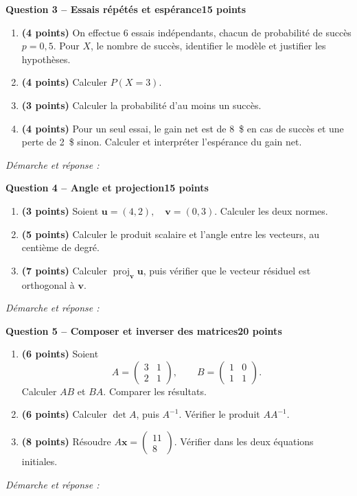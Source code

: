 \documentclass[11pt,a4paper]{article}
\begin{document}
\newpage
{\large\bfseries Question 3 -- Essais répétés et espérance}\hfill\textbf{15 points}\par
\begin{enumerate}
\item \textbf{(4 points)} On effectue 6 essais indépendants, chacun de probabilité de succès \(p=0{,}5\). Pour \(X\), le nombre de succès, identifier le modèle et justifier les hypothèses.
\item \textbf{(4 points)} Calculer \(P(X=3)\).
\item \textbf{(3 points)} Calculer la probabilité d’au moins un succès.
\item \textbf{(4 points)} Pour un seul essai, le gain net est de 8~\$ en cas de succès et une perte de 2~\$ sinon. Calculer et interpréter l’espérance du gain net.
\end{enumerate}
\vspace{3mm}\textit{Démarche et réponse :}\par\vfill

\newpage
{\large\bfseries Question 4 -- Angle et projection}\hfill\textbf{15 points}\par
\begin{enumerate}
\item \textbf{(3 points)} Soient \(\mathbf u=(4,2),\quad\mathbf v=(0,3)\). Calculer les deux normes.
\item \textbf{(5 points)} Calculer le produit scalaire et l’angle entre les vecteurs, au centième de degré.
\item \textbf{(7 points)} Calculer \(\operatorname{proj}_{\mathbf v}\mathbf u\), puis vérifier que le vecteur résiduel est orthogonal à \(\mathbf v\).
\end{enumerate}
\vspace{3mm}\textit{Démarche et réponse :}\par\vfill

\newpage
{\large\bfseries Question 5 -- Composer et inverser des matrices}\hfill\textbf{20 points}\par
\begin{enumerate}
\item \textbf{(6 points)} Soient \[A=\begin{pmatrix}3 & 1\\2 & 1\end{pmatrix},\qquad B=\begin{pmatrix}1 & 0\\1 & 1\end{pmatrix}.\] Calculer \(AB\) et \(BA\). Comparer les résultats.
\item \textbf{(6 points)} Calculer \(\det A\), puis \(A^{-1}\). Vérifier le produit \(AA^{-1}\).
\item \textbf{(8 points)} Résoudre \(A\mathbf x=\begin{pmatrix}11\\8\end{pmatrix}\). Vérifier dans les deux équations initiales.
\end{enumerate}
\vspace{3mm}\textit{Démarche et réponse :}\par\vfill
\end{document}

